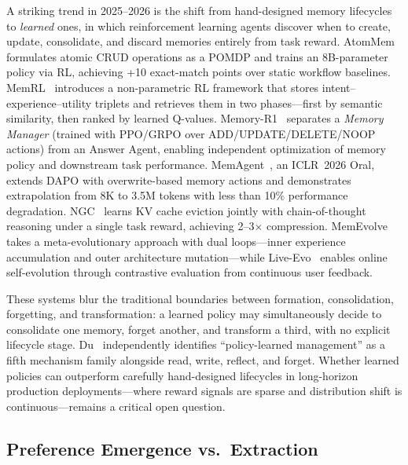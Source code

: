 A striking trend in 2025--2026 is the shift from hand-designed memory
lifecycles to \emph{learned} ones, in which reinforcement learning
agents discover when to create, update, consolidate, and discard
memories entirely from task reward. AtomMem~\cite{chen2026atommem}
formulates atomic CRUD operations as a POMDP and trains an 8B-parameter
policy via RL, achieving +10 exact-match points over static workflow
baselines. MemRL~\cite{wang2026memrl} introduces a non-parametric RL
framework that stores intent--experience--utility triplets and retrieves
them in two phases---first by semantic similarity, then ranked by learned
Q-values. Memory-R1~\cite{memoryr1_2026} separates a \emph{Memory
Manager} (trained with PPO/GRPO over ADD/UPDATE/DELETE/NOOP actions)
from an Answer Agent, enabling independent optimization of memory
policy and downstream task performance.
MemAgent~\cite{memagent2026}, an ICLR~2026 Oral, extends DAPO with
overwrite-based memory actions and demonstrates extrapolation from 8K
to 3.5M tokens with less than 10\% performance degradation.
NGC~\cite{li2026ngc} learns KV cache eviction jointly with
chain-of-thought reasoning under a single task reward, achieving 2--3$\times$
compression. MemEvolve~\cite{memevolve2025} takes a meta-evolutionary
approach with dual loops---inner experience accumulation and outer
architecture mutation---while Live-Evo~\cite{liveevo2026} enables
online self-evolution through contrastive evaluation from continuous
user feedback.

These systems blur the traditional boundaries between formation,
consolidation, forgetting, and transformation: a learned policy may
simultaneously decide to consolidate one memory, forget another, and
transform a third, with no explicit lifecycle stage.
Du~\cite{du2026memoryautonomous} independently identifies
``policy-learned management'' as a fifth mechanism family alongside
read, write, reflect, and forget. Whether learned policies can
outperform carefully hand-designed lifecycles in long-horizon production
deployments---where reward signals are sparse and distribution shift is
continuous---remains a critical open question.

\subsection{Preference Emergence vs.\ Extraction}

